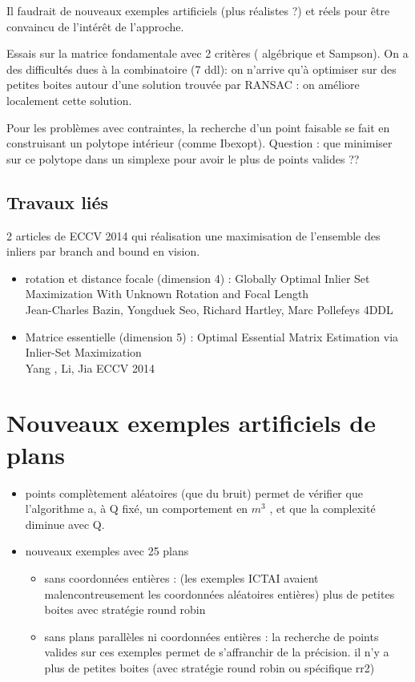 \documentclass{article}
\begin{document}
Il faudrait de nouveaux exemples artificiels (plus r\'ealistes ?)   et r\'eels   pour \^etre convaincu de l'int\'er\^et de l'approche.
  
   Essais sur la matrice fondamentale avec 2 crit\`eres ( alg\'ebrique  et Sampson). On a des
   difficult\'es dues \`a la combinatoire (7 ddl): on n'arrive qu'\`a optimiser sur des petites boites autour d'une solution trouv\'ee par RANSAC : on am\'eliore localement cette solution.


Pour les probl\`emes avec contraintes, la recherche d'un point faisable se fait en construisant un polytope int\'erieur
(comme Ibexopt).  Question : que minimiser sur ce polytope dans un simplexe pour avoir le plus de points valides ??


\subsection {Travaux li\'es}

2 articles de ECCV 2014 qui r\'ealisation une maximisation de l'ensemble des inliers par branch and bound en vision.
\begin{itemize}
\item {rotation et distance focale  (dimension 4)} : 
Globally Optimal Inlier Set Maximization
With Unknown Rotation and Focal Length\\
Jean-Charles Bazin, Yongduek Seo, Richard Hartley, Marc Pollefeys   4DDL
\item {Matrice essentielle (dimension 5) } :
Optimal Essential Matrix Estimation via
Inlier-Set Maximization  \\
  Yang , Li, Jia ECCV 2014  

\end{itemize}




\section {Nouveaux exemples artificiels de plans }

\begin{itemize}

   \item points compl\`etement al\'eatoires (que du bruit)
     permet de v\'erifier que l'algorithme a, \`a Q fix\'e, un comportement en $m^3$ , et que la complexit\'e
diminue avec Q.

  \item  nouveaux exemples avec 25 plans
\begin{itemize}
      \item     sans coordonn\'ees enti\`eres : (les exemples ICTAI avaient malencontreusement les coordonn\'ees al\'eatoires enti\`eres)   plus de petites boites avec strat\'egie round robin

      \item sans plans parall\`eles ni coordonn\'ees enti\`eres : la recherche de points valides sur ces exemples
permet de s'affranchir de la pr\'ecision.  il n'y a plus de petites boites (avec strat\'egie round robin ou sp\'ecifique rr2)
\end{itemize}
   
\end{itemize}
\end{document}
